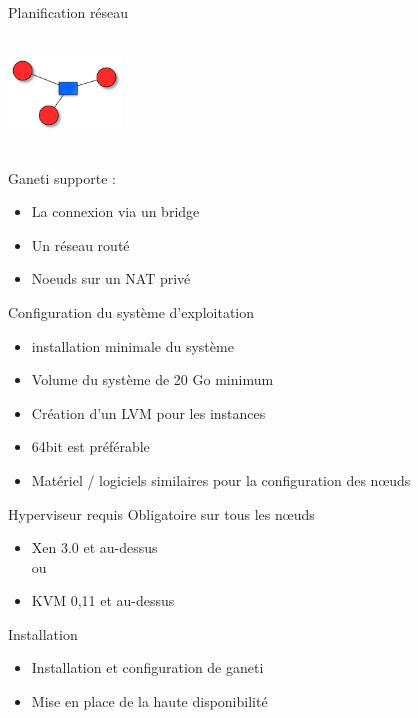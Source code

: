 \begin{frame}{Planification réseau}
\begin{center}
  \includegraphics[width=3cm,height=3cm]{images_presentation/network.png}
\end{center}
\begin{block}{Ganeti supporte :}
\begin{itemize}
\item La connexion via un bridge
\item Un réseau routé
\item Noeuds sur un NAT privé
\end{itemize}
\end{block}
\end{frame}

\begin{frame}{Configuration du système d'exploitation}
\begin{itemize}
\item installation minimale du système
\pause
\item Volume du système de 20 Go minimum
\pause
\item Création d'un LVM pour les instances
\pause
\item 64bit est préférable
\pause
\item Matériel / logiciels similaires pour la configuration des nœuds
\end{itemize}
\end{frame}

\begin{frame}{Hyperviseur requis}
Obligatoire sur tous les nœuds
\begin{itemize}
\item Xen 3.0 et au-dessus \\ou
\item KVM 0,11 et au-dessus
\end{itemize}
\end{frame}

\begin{frame}{Installation}
\begin{itemize}
\item Installation et configuration de ganeti
\pause
\item Mise en place de la haute disponibilité
\end{itemize}
\end{frame}

